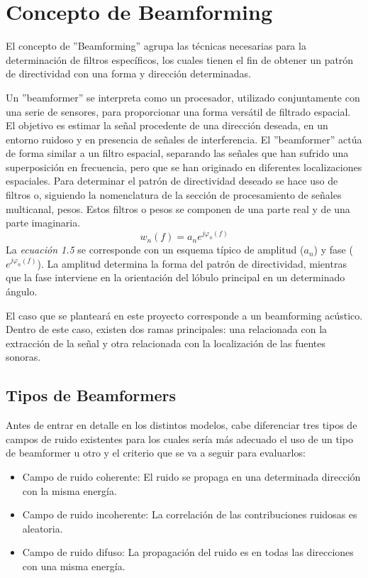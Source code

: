\documentclass[a4paper,11pt]{book}
\begin{document}
	\section{Concepto de Beamforming}
	El concepto de ''Beamforming'' agrupa las técnicas necesarias para la determinación de filtros específicos, los cuales tienen el fin de obtener un patrón de directividad con una forma y dirección determinadas.
	
	Un ''beamformer'' se interpreta como un procesador, utilizado conjuntamente con una serie de sensores, para proporcionar una forma versátil de filtrado espacial. El objetivo es estimar la señal procedente de una dirección deseada, en un entorno ruidoso y en presencia de señales de interferencia. El ''beamformer'' actúa de forma similar a un filtro espacial, separando las señales que han sufrido una superposición en frecuencia, pero que se han originado en diferentes localizaciones espaciales. Para determinar el patrón de directividad deseado se hace uso de filtros o, siguiendo la nomenclatura de la sección de procesamiento de señales multicanal, pesos. Estos filtros o pesos se componen de una parte real y de una parte imaginaria.
	\begin{equation}
	w_{n}(f) = a_{n} e^{j\varphi_{n}(f)}
	\end{equation}
	La \textit{ecuación 1.5} se corresponde con un esquema típico de amplitud ($a_{n}$) y fase ($e^{j\varphi_{n}(f)}$). La amplitud determina la forma del patrón de directividad, mientras que la fase interviene en la orientación del lóbulo principal en un determinado ángulo.
	
	El caso que se planteará en este proyecto corresponde a un beamforming acústico. Dentro de este caso, existen dos ramas principales: una relacionada con la extracción de la señal y otra relacionada con la localización de las fuentes sonoras.
		\subsection{Tipos de Beamformers}
		
		Antes de entrar en detalle en los distintos modelos, cabe diferenciar tres tipos de campos de ruido existentes para los cuales sería más adecuado el uso de un tipo de beamformer u otro y el criterio que se va a seguir para evaluarlos:
		\begin{itemize}
		\item Campo de ruido coherente: El ruido se propaga en una determinada dirección con la misma energía.
		\item Campo de ruido incoherente: La correlación de las contribuciones ruidosas es aleatoria.
		\item Campo de ruido difuso: La propagación del ruido es en todas las direcciones con una misma energía.
		\end{itemize}
		
\end{document}
